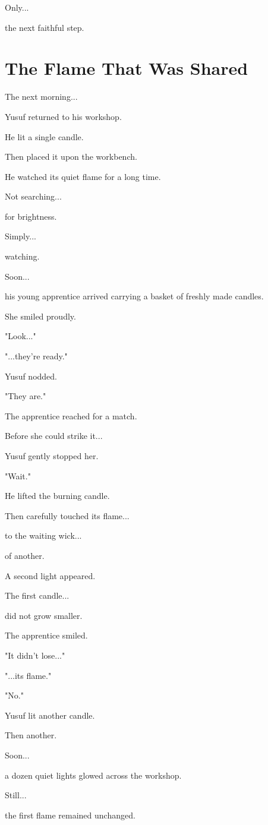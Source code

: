\documentclass[12pt,openany]{book}
\begin{document}
Only...

the next faithful step.
\section*{The Flame That Was Shared}

The next morning...

Yusuf returned to his workshop.

He lit a single candle.

Then placed it upon the workbench.

He watched its quiet flame for a long time.

Not searching...

for brightness.

Simply...

watching.

Soon...

his young apprentice arrived carrying a basket of freshly made candles.

She smiled proudly.

"Look..."

"...they're ready."

Yusuf nodded.

"They are."

The apprentice reached for a match.

Before she could strike it...

Yusuf gently stopped her.

"Wait."

He lifted the burning candle.

Then carefully touched its flame...

to the waiting wick...

of another.

A second light appeared.

The first candle...

did not grow smaller.

The apprentice smiled.

"It didn't lose..."

"...its flame."

"No."

Yusuf lit another candle.

Then another.

Soon...

a dozen quiet lights glowed across the workshop.

Still...

the first flame remained unchanged.
\end{document}
